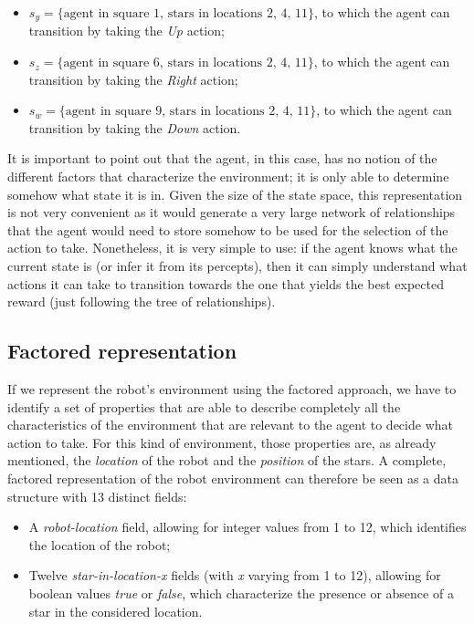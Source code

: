 \documentclass[letterpaper,headings=standardclasses]{scrartcl}
\begin{document}
\begin{itemize}

\item $ s_y = \{ \text{agent in square 1, stars in locations 2, 4, 11} \} $, to which the agent can transition by taking the \emph{Up} action;

\item $ s_z = \{ \text{agent in square 6, stars in locations 2, 4, 11} \} $, to which the agent can transition by taking the \emph{Right} action;

\item $ s_w = \{ \text{agent in square 9, stars in locations 2, 4, 11} \} $, to which the agent can transition by taking the \emph{Down} action.

\end{itemize}

It is important to point out that the agent, in this case, has no notion of the different factors that characterize the environment; it is only able to determine somehow what state it is in. Given the size of the state space, this representation is not very convenient as it would generate a very large network of relationships that the agent would need to store somehow to be used for the selection of the action to take. Nonetheless, it is very simple to use: if the agent knows what the current state is (or infer it from its percepts), then it can simply understand what actions it can take to transition towards the one that yields the best expected reward (just following the tree of relationships).

\subsection{Factored representation}

If we represent the robot’s environment using the factored approach, we have to identify a set of properties that are able to describe completely all the characteristics of the environment that are relevant to the agent to decide what action to take. For this kind of environment, those properties are, as already mentioned, the \emph{location} of the robot and the \emph{position} of the stars. A complete, factored representation of the robot environment can therefore be seen as a data structure with 13 distinct fields:

\begin{itemize}

\item A \emph{robot-location} field, allowing for integer values from 1 to 12, which identifies the location of the robot;

\item Twelve \emph{star-in-location-x} fields (with \emph{x} varying from 1 to 12), allowing for boolean values \emph{true} or \emph{false}, which characterize the presence or absence of a star in the considered location.

\end{itemize}
\end{document}
